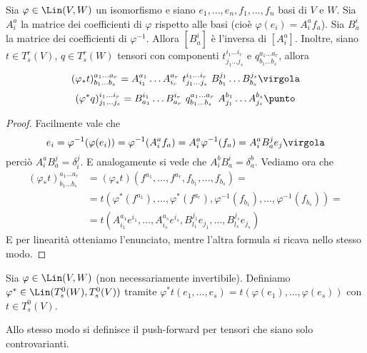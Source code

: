 \begin{proposition}
	Sia $\varphi\in \Lin(V,W)$ un isomorfismo e siano $e_1,\ldots,e_n,f_1,\ldots,f_n$ basi di $V$ e $W$.
	Sia $A_i^a$ la matrice dei coefficienti di $\varphi$ rispetto alle basi (cioè $\varphi(e_i) = A_i^af_a$).
	Sia $B_a^i$ la matrice dei coefficienti di $\varphi^{-1}$.
	Allora $[B_a^i]$ è l'inversa di $[A_i^a]$. Inoltre, siano $t\in T_s^r(V)$, $q\in T_s^r(W)$ tensori con componenti $t_{j_1 \ldots j_s}^{i_1 \ldots i_r}$ e $q_{b_1 \ldots b_s}^{a_1 \ldots a_r}$, allora
	\begin{equation*} 
		(\varphi_*t)_{b_1 \ldots b_s}^{a_1 \ldots a_r} = A_{i_1}^{a_1}\ldots A_{i_r}^{a_r}\ t_{j_1\ldots j_s}^{i_1 \ldots i_r}\ B_{b_1}^{j_1}\ldots B_{b_s}^{j_s} \virgola
	\end{equation*}
	\begin{equation*}
		(\varphi^*q)_{j_1 \ldots j_s}^{i_1 \ldots i_r} =B_{a_1}^{i_1}\ldots B_{a_r}^{i_r}\ q_{b_1 \ldots b_s}^{a_1 \ldots a_r}\ A_{j_1}^{b_1}\ldots A_{j_s}^{b_s} \punto
	\end{equation*}
\end{proposition}

\begin{proof}
	Facilmente vale che
	\begin{equation*}
		e_i = \varphi^{-1}(\varphi(e_i)) = \varphi^{-1}(A_i^af_a) = A_i^a\varphi^{-1}(f_a) = A_i^a B_a^j e_j \virgola
	\end{equation*}
	perciò $A_i^a B_a^j = \delta_i^j$. E analogamente si vede che $A_i^bB_a^i = \delta_a^b$. %
	Vediamo ora che
	\begin{align*}
		(\varphi_*t)_{b_1 \ldots b_s}^{a_1 \ldots a_r} &= (\varphi_*t)(f^{a_1},\ldots, f^{a_r},f_{b_1},\ldots,f_{b_s}) =\\
		&= t(\varphi^*(f^{a_1}),\ldots, \varphi^*(f^{a_r}),\varphi^{-1}(f_{b_1}),\ldots,\varphi^{-1}(f_{b_s})) =\\
		&=t (A_{i_1}^{a_1} e^{i_1}, \ldots, A_{i_s}^{a_s} e^{i_s},B_{l_1}^{j_1}e_{j_1}, \ldots, B_{l_s}^{j_s}e_{j_s})
	\end{align*}
	E per linearità otteniamo l'enunciato, mentre l'altra formula si ricava nello stesso modo.
\end{proof}

\begin{definition}  
	Sia $\varphi\in \Lin(V,W)$ (non necessariamente invertibile). Definiamo $\varphi^*\in \Lin(T_s^0(W),T_s^0(V))$ tramite $\varphi^*t(e_1,\ldots,e_s) = t(\varphi(e_1),\ldots,\varphi(e_s))$ con $t\in T_s^0(V)$.
	
	Allo stesso modo si definisce il push-forward per tensori che siano solo controvarianti.
\end{definition}

